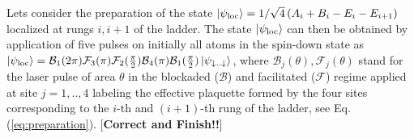 \documentclass[prl,aps,twocolumn,showpacs,superscriptaddress,longbibliography]{revtex4-1}
\newcommand{\ran}{\right\rangle}
\newcommand{\ket}[1]{\left| #1 \ran}
\begin{document}
Lets consider the preparation of the state $\ket{\psi_{\rm loc}} = 1/\sqrt{4} \left( A_i + B_i - E_i - E_{i+1} \right)$ localized at rungs $i,i+1$ of the ladder. The state $\ket{\psi_{\rm loc}}$ can then be obtained by application of five pulses on initially all atoms in the spin-down state as $\ket{\psi_{\rm loc}} = \mathcal{B}_1(2 \pi) \mathcal{F}_3(\pi) \mathcal{F}_2(\frac{\pi}{2}) \mathcal{B}_4(\pi) \mathcal{B}_1(\frac{\pi}{2}) \ket{\psi_{\downarrow..\downarrow}}$, where $\mathcal{B}_j(\theta),\mathcal{F}_j(\theta)$ stand for the laser pulse of area $\theta$ in the blockaded ($\mathcal{B}$) and facilitated ($\mathcal{F}$) regime applied at site $j=1,..,4$ labeling the effective plaquette formed by the four sites corresponding to the $i$-th and $(i+1)$-th rung of the ladder, see Eq. (\ref{eq:preparation}). [{\bf Correct and Finish!!}]
\end{document}
